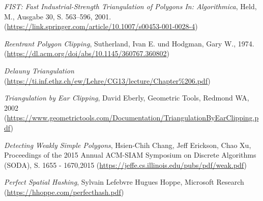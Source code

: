 \begin{thebibliography}{11}
    \emph{FIST: Fast Industrial-Strength Triangulation of Polygons In: Algorithmica}, Held, M., Ausgabe 30, S. 563–596, 2001.
    (\href{https://link.springer.com/article/10.1007/s00453-001-0028-4}{https://link.springer.com/article/10.1007/s00453-001-0028-4})
    
    \emph{Reentrant Polygon Clipping}, Sutherland, Ivan E. und Hodgman, Gary W., 1974. \break
    (\href{https://dl.acm.org/doi/abs/10.1145/360767.360802}{https://dl.acm.org/doi/abs/10.1145/360767.360802})

    \emph{Delauny Triangulation} \break
    (\href{https://ti.inf.ethz.ch/ew/Lehre/CG13/lecture/Chapter%206.pdf}{https://ti.inf.ethz.ch/ew/Lehre/CG13/lecture/Chapter\%206.pdf})

    \emph{Triangulation by Ear Clipping}, David Eberly, Geometric Tools, Redmond WA, 2002 \break
    (\href{https://www.geometrictools.com/Documentation/TriangulationByEarClipping.pdf}{https://www.geometrictools.com/Documentation/TriangulationByEarClipping.pdf})

    \emph{Detecting Weakly Simple Polygons}, Hsien-Chih Chang, Jeff Erickson, Chao Xu, Proceedings of the 2015 Annual ACM-SIAM Symposium on Discrete Algorithms (SODA), S. 1655 - 1670,2015\break
    (\href{https://jeffe.cs.illinois.edu/pubs/pdf/weak.pdf}{https://jeffe.cs.illinois.edu/pubs/pdf/weak.pdf})

    \emph{Perfect Spatial Hashing}, Sylvain Lefebvre Hugues Hoppe, Microsoft Research
    (\href{https://hhoppe.com/perfecthash.pdf}{https://hhoppe.com/perfecthash.pdf})
\end{thebibliography}